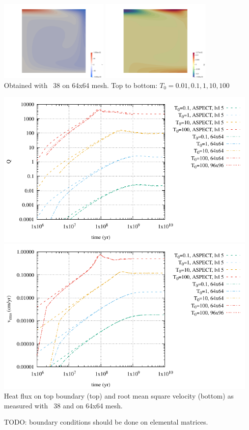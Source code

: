 \begin{center}
\includegraphics[height=4cm]{python_codes/fieldstone_38/results/T0_100_64x64/T}
\includegraphics[height=4cm]{python_codes/fieldstone_38/results/T0_100_64x64/qy}\\
{\captionfont Obtained with \stone~38 on 64x64 mesh. 
Top to bottom: $T_0=0.01,0.1,1,10,100$}
\end{center}

\newpage
\begin{center}
\includegraphics[width=13cm]{python_codes/fieldstone_38/results/Q.pdf}\\
\includegraphics[width=13cm]{python_codes/fieldstone_38/results/vrms.pdf}\\
{\captionfont Heat flux on top boundary (top) and root mean square velocity (bottom)
as measured with \stone~38 and \aspect on 64x64 mesh.}
\end{center}

TODO: boundary conditions should be done on elemental matrices.




